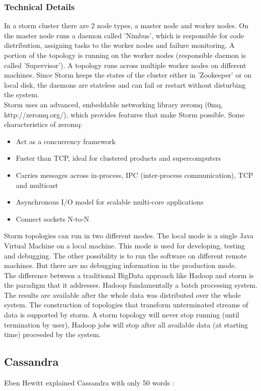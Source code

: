 \documentclass[a4paper]{article}
\begin{document}
\subsubsection{Technical Details}
In a storm cluster there are 2 node types, a master node and worker nodes. On the master node runs a daemon called 'Nimbus', which is responsible for code distribution, assigning tasks to the worker nodes and failure monitoring. A portion of the topology is running on the worker nodes (responsible daemon is called 'Supervisor'). A topology runs across multiple worker nodes on different machines. Since Storm keeps the states of the cluster either in 'Zookeeper' or on local disk, the daemons are stateless and can fail or restart without disturbing the system.\\
Storm uses an advanced, embeddable networking library zeromq (0mq, http://zeromq.org/), which provides features that make Storm possible. Some characteristics of zeromq:
\begin{itemize}
	\item Act as a concurrency framework
	\item Faster than TCP, ideal for clustered products and supercomputers
	\item Carries messages across in-process, IPC (inter-process communication), TCP and multicast
	\item Asynchronous I/O model for scalable multi-core applications
	\item Connect sockets N-to-N 
\end{itemize}
Storm topologies can run in two different modes. The local mode is a single Java Virtual Machine on a local machine. This mode is used for developing, testing and debugging. The other possibility is to run the software on different remote machines. But there are no debugging information in the production mode.\\

The difference between a traditional BigData approach like Hadoop and storm is the paradigm that it addresses. Hadoop fundamentally a batch processing system. The results are available after the whole data was distributed over the whole system. The construction of topologies that transform unterminated streams of data is supported by storm. A storm topology will never stop running (until termination by user), Hadoop jobs will stop after all available data (at starting time) proceeded by the system.

\subsection{Cassandra}
Eben Hewitt explained Cassandra with only 50 words \cite{cassandraBook}:\\
\end{document}
